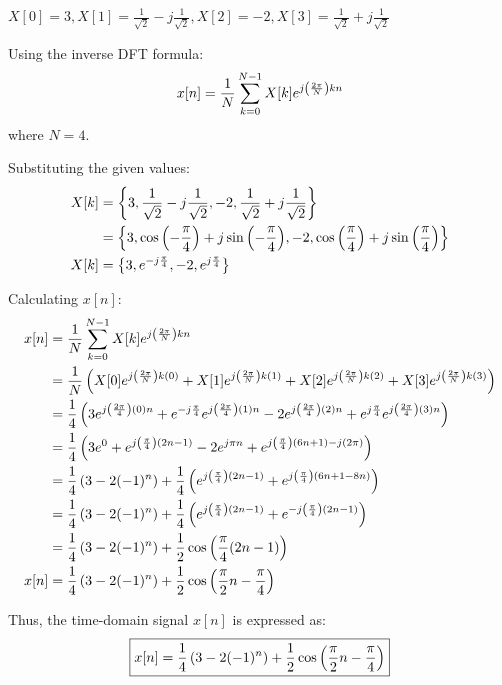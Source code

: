 \documentclass[a4paper, 10pt]{article}
\begin{document}
\begin{tosubmit}
\begin{subsubproblems}[start=1]
    \item \( X[0]=3, X[1]= \frac{1}{\sqrt{2}}-j\frac{1}{\sqrt{2}}, X[2]=-2, X[3]= \frac{1}{\sqrt{2}}+j\frac{1}{\sqrt{2}} \)
\end{subsubproblems}

\par\noindent\submitsolution
Using the inverse DFT formula:
\[ x[n] = \frac{1}{N} \sum_{k=0}^{N-1} X[k] e^{j \left( \frac{2\pi}{N} \right) kn} \]
where \( N = 4 \).

\vspace{2mm}

Substituting the given values:
\begin{align*}
    X[k] &= \left\{ 3, \frac{1}{\sqrt{2}}-j\frac{1}{\sqrt{2}}, -2, \frac{1}{\sqrt{2}}+j\frac{1}{\sqrt{2}} \right\} \\
    &= \left\{ 3, \cos{ \left( -\frac{\pi}{4} \right) } + j \sin{ \left( -\frac{\pi}{4} \right) }, -2, \cos{ \left( \frac{\pi}{4} \right) } + j \sin{ \left( \frac{\pi}{4} \right) } \right\} \\
    X[k] &= \left\{ 3, e^{-j\frac{\pi}{4}}, -2, e^{j\frac{\pi}{4}} \right\}
\end{align*}

Calculating \( x[n] \):
\begin{align*}
    x[n] &= \frac{1}{N} \sum_{k=0}^{N-1} X[k] e^{j \left( \frac{2\pi}{N} \right) kn} \\
    &= \frac{1}{N} \left( X[0] e^{j \left( \frac{2\pi}{N} \right) k(0)} + X[1] e^{j \left( \frac{2\pi}{N} \right) k(1)} + X[2] e^{j \left( \frac{2\pi}{N} \right) k(2)} + X[3] e^{j \left( \frac{2\pi}{N} \right) k(3)} \right) \\
    &= \frac{1}{4} \left( 3 e^{j \left( \frac{2\pi}{4} \right) ( 0 ) n} + e^{-j\frac{\pi}{4}} e^{j \left( \frac{2\pi}{4} \right) ( 1 ) n} - 2 e^{j \left( \frac{2\pi}{4} \right) ( 2 ) n} + e^{j\frac{\pi}{4}} e^{j \left( \frac{2\pi}{4} \right) ( 3 ) n} \right) \\
    &= \frac{1}{4} \left( 3 e^{ 0 } + e^{j \left( \frac{\pi}{4} \right) (2n - 1)} - 2 e^{j \pi n} + e^{j \left( \frac{\pi}{4} \right) (6n + 1) - j ( 2 \pi )} \right) \\
    &= \frac{1}{4} \left( 3 - 2(-1)^n \right) + \frac{1}{4} \left( e^{j \left( \frac{\pi}{4} \right) (2n - 1)} + e^{j \left( \frac{\pi}{4} \right) (6n + 1 - 8n)} \right) \\
    &= \frac{1}{4} \left( 3 - 2(-1)^n \right) + \frac{1}{4} \left( e^{j \left( \frac{\pi}{4} \right) (2n - 1)} + e^{-j \left( \frac{\pi}{4} \right) (2n - 1)} \right) \\
    &= \frac{1}{4} \left( 3 - 2(-1)^n \right) + \frac{1}{2} \cos{\left( \frac{\pi}{4} (2n - 1)\right) } \\
    x[n] &= \frac{1}{4} \left( 3 - 2(-1)^n \right) + \frac{1}{2} \cos{\left( \frac{\pi}{2} n - \frac{\pi}{4}\right) }
\end{align*}

Thus, the time-domain signal \( x[n] \) is expressed as:
\[ \boxed{ x[n] = \frac{1}{4} \left( 3 - 2(-1)^n \right) + \frac{1}{2} \cos{\left( \frac{\pi}{2} n - \frac{\pi}{4}\right) } } \]
\end{tosubmit}
\end{document}
